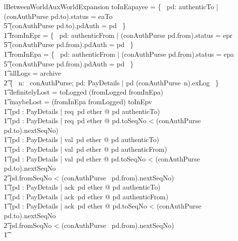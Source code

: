 \begin{LNewLemma}
\begin{theorem}{lBetweenWorldAuxWorldExpansion}
            toInEapayee = \{~ pd: authenticTo | (conAuthPurse pd.to).status = eaTo \\
                    \t5 \land (conAuthPurse pd.to).pdAuth = pd ~\} \land \\ \t1
            fromInEpr = \{~ pd: authenticFrom | (conAuthPurse pd.from).status = epr \\
                    \t5 \land (conAuthPurse pd.from).pdAuth = pd ~\} \land \\ \t1
            fromInEpa = \{~ pd: authenticFrom | (conAuthPurse pd.from).status = epa \\
                    \t5 \land (conAuthPurse pd.from).pdAuth = pd ~\} \land \\ \t1
            allLogs = archive \cup \\
                \t2 \{~ n: \dom~conAuthPurse; pd: PayDetails | pd \in (conAuthPurse~n).exLog ~\} \land \\ \t1
            definitelyLost = toLogged \cap (fromLogged \cup fromInEpa) \land \\ \t1
            maybeLost = (fromInEpa \cup fromLogged) \cap toInEpv \land \\
    \t1
            (\forall pd : PayDetails | req~pd \in ether @ pd \in authenticTo)
            \land \\ \t1
            (\forall pd : PayDetails | req~pd \in ether @
                 pd.toSeqNo < (conAuthPurse~ pd.to).nextSeqNo) \\ \t1
            \land
            (\forall pd : PayDetails | val~pd \in ether @ pd \in authenticTo) \land \\ \t1
            (\forall pd : PayDetails | val~pd \in ether @ pd \in authenticFrom) \land \\ \t1
            (\forall pd : PayDetails | val~pd \in ether @ pd.toSeqNo < (conAuthPurse~ pd.to).nextSeqNo \\
                \t2 \land pd.fromSeqNo < (conAuthPurse~ pd.from).nextSeqNo) \land \\ \t1
            (\forall pd : PayDetails | ack~pd \in ether @ pd \in authenticTo)\land  \\ \t1
            (\forall pd : PayDetails | ack~pd \in ether @ pd \in authenticFrom) \land \\ \t1
            (\forall pd : PayDetails | ack~pd \in ether @ pd.toSeqNo < (conAuthPurse~ pd.to).nextSeqNo  \\ %
                \t2 \land pd.fromSeqNo < (conAuthPurse~ pd.from).nextSeqNo) \land \\ \t1

\end{theorem}
\end{LNewLemma}
